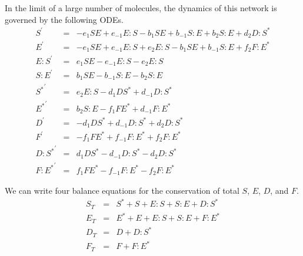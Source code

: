 \documentclass[aip,jcp,preprint]{revtex4-1}
\begin{document}
\begin{widetext}
In the limit of a large number of molecules, the dynamics of this network is governed by the following ODEs.
\begin{equation}
    \begin{array}{rcl}
        S^\prime & = & -e_1 S E + e_{-1} E:S -b_1 S E + b_{-1} S:E + b_2 S:E + d_2 D:S^{*} \\
        E^\prime & = & -e_1 S E + e_{-1} E:S + e_2 E:S - b_1 S E +b_{-1} S:E + f_2 F:E^{*} \\
        E:S^\prime & = & e_1 S E -e_{-1} E:S -e_2 E:S \\
        S:E^\prime & = & b_1 S E -b_{-1} S:E -b_2 S:E \\
        {S^{*}}^\prime & = & e_2 E:S -d_1 D S^{*} + d_{-1} D:S^{*} \\
        {E^{*}}^\prime & = & b_2 S:E -f_1 F E^{*} + d_{-1} F:E^{*} \\
        D^\prime & = & -d_1 D S^{*} + d_{-1} D:S^{*} + d_2 D:S^{*} \\
        F^\prime & = & -f_1 F E^{*} + f_{-1} F:E^{*} + f_2 F:E^{*} \\
        {D:S^{*}}^\prime & = & d_1 D S^{*} - d_{-1} D:S^{*} -d_2 D:S^{*} \\
        {F:E^{*}}^\prime & = & f_1 FE^{*} - f_{-1} F:E^{*} -f_2 F:E^{*}
    \end{array}
\end{equation}
\end{widetext}

We can write four balance equations for the conservation of total $S$, $E$, $D$, and $F$.
\begin{equation}
    \begin{array}{rcl}
        S_T & = & S^{*} + S + E:S + S:E + D:S^{*} \\
        E_T & = & E^{*} + E + E:S + S:E + F:E^{*} \\
        D_T & = & D + D:S^{*} \\
        F_T & = & F + F:E^{*}
    \end{array}
\end{equation}
\end{document}
